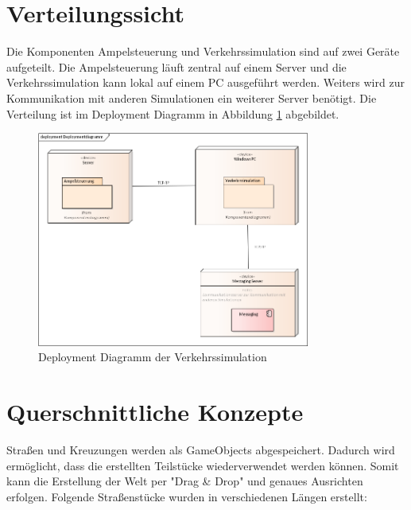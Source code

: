 \section{Verteilungssicht}
\label{Verteilungssicht}

Die Komponenten Ampelsteuerung und Verkehrssimulation sind auf zwei Geräte aufgeteilt. Die Ampelsteuerung läuft zentral auf einem Server und die Verkehrssimulation kann lokal auf einem PC
ausgeführt werden. Weiters wird zur Kommunikation mit anderen Simulationen ein weiterer Server benötigt. Die Verteilung ist im Deployment Diagramm in Abbildung \ref{fig_2_3} abgebildet.

\begin{figure}[H]
\begin{center}
	\includegraphics[width=0.8\textwidth]{BilderAllgemein/Deploymentdiagramm.png}
\end{center}
	\caption{Deployment Diagramm der Verkehrssimulation}
	\label{fig_2_3}
\end{figure}

\section{Querschnittliche Konzepte}
\label{Querschnittliche Konzepte}

Straßen und Kreuzungen werden als GameObjects abgespeichert. Dadurch wird ermöglicht, dass die erstellten Teilstücke wiederverwendet werden können. Somit kann die Erstellung der Welt per "Drag \& Drop" und genaues Ausrichten erfolgen. Folgende Straßenstücke wurden in verschiedenen Längen erstellt:

